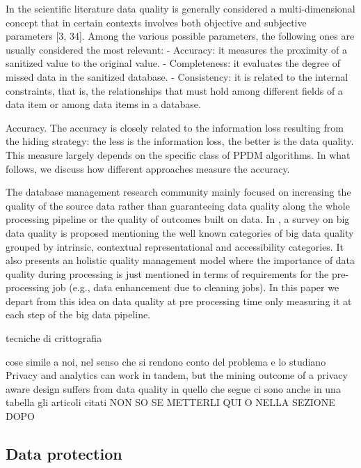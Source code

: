In the scientific literature data quality is generally
considered a multi-dimensional concept that in certain contexts involves
both objective and subjective parameters [3, 34]. Among the various possible
parameters, the following ones are usually considered the most relevant:
- Accuracy: it measures the proximity of a sanitized value to the original
value.
- Completeness: it evaluates the degree of missed data in the sanitized
database.
- Consistency: it is related to the internal constraints, that is, the relationships
that must hold among different fields of a data item or among data
items in a database.

Accuracy. The accuracy is closely related to the information loss resulting
from the hiding strategy: the less is the information loss, the better is the
data quality. This measure largely depends on the specific class of PPDM algorithms.
In what follows, we discuss how different approaches measure the
accuracy.



The database management research community mainly focused on increasing the quality of the source data rather than guaranteeing data quality along the whole processing pipeline or the quality of outcomes built on data.
In \cite{BigDataQaulitySurvey}, a survey on big data quality is proposed mentioning the well known categories of big data quality grouped by intrinsic, contextual representational and accessibility categories.
It also presents an holistic quality management model where the importance of data quality during processing is just mentioned in terms of requirements for the pre-processing job (e.g., data enhancement due to cleaning jobs).
In this paper we depart from this idea on data quality at pre processing time only measuring it at each step of the big data pipeline.

tecniche di crittografia
\cite{8863330} \cite{Majeed2021AnonymizationTF}

cose simile a noi, nel senso che si rendono conto del problema e lo studiano
Privacy and analytics can work in tandem, but the mining outcome of a privacy aware design suffers from data quality
 in quello che segue ci sono anche in una tabella gli articoli citati
 NON SO SE METTERLI QUI O NELLA SEZIONE DOPO
 \cite{10.1007/978-981-15-0372-6_19}

\subsection{Data protection}

